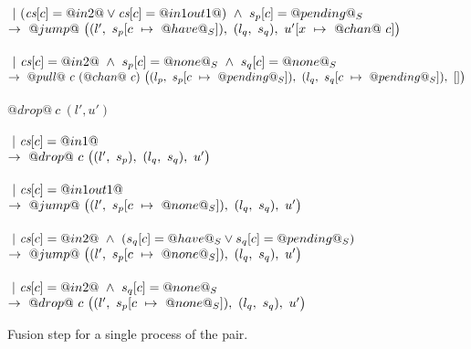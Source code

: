 \begin{figure*}
\begin{tabbing}
\> \>  \\
\> \> $~|~(\cs[c]=@in2@ \vee \cs[c]=@in1out1@) ~\wedge~ s_p[c]=@pending@_S$ \\
\> \> $\to~@jump@~
      \nextStep
        {l'}
          {\HeapUpdateOne{c}{@have@_S}{s_p}}
        {l_q}
          {s_q}
        {\HeapUpdateOne{x}{@chan@~c}{u'}}
        $ \\

\> \> \\
\> \> $~|~\cs[c]=@in2@ ~\wedge~ s_p[c]=@none@_S ~\wedge~ s_q[c]=@none@_S$ \\
\> \> $\to~@pull@~c~(@chan@~c)~
      \nextStep
        {l_p}
          {\HeapUpdateOne{c}{@pending@_S}{s_p}}
        {l_q}
          {\HeapUpdateOne{c}{@pending@_S}{s_q}}
        {[]}
  $ \\
\\

\> $@drop@~c~(l',u')$ \\
\> \>  \\
\> \> $~|~\cs[c]=@in1@$ \\
\> \> $\to~@drop@~c~
      \nextStep
        {l'}
          {s_p}
        {l_q}
          {s_q}
        {u'}
      $ \\

\> \> \\
\> \> $~|~\cs[c]=@in1out1@$ \\
\> \> $\to~@jump@~
      \nextStep
        {l'}
          {\HeapUpdateOne{c}{@none@_S}{s_p}}
        {l_q}
          {s_q}
        {u'}
      $ \\

\> \> \\
\> \> $~|~\cs[c]=@in2@ ~\wedge~ (s_q[c]=@have@_S \vee s_q[c]=@pending@_S)$ \\
\> \> $\to~@jump@~
      \nextStep
        {l'}
          {\HeapUpdateOne{c}{@none@_S}{s_p}}
        {l_q}
          {s_q}
        {u'}
      $ \\


\> \> \\
\> \> $~|~\cs[c]=@in2@ ~\wedge~ s_q[c]=@none@_S$ \\
\> \> $\to~@drop@~c~
      \nextStep
        {l'}
          {\HeapUpdateOne{c}{@none@_S}{s_p}}
        {l_q}
          {s_q}
        {u'}
      $
\end{tabbing}

\caption{Fusion step for a single process of the pair.} 

\label{fig:Fusion:Def:Step}
\end{figure*}

